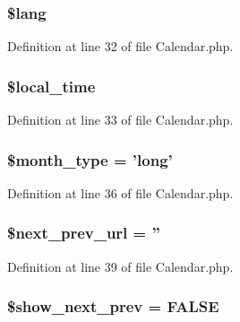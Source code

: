\subsubsection[{\$lang}]{\setlength{\rightskip}{0pt plus 5cm}\$lang}\label{class_c_i___calendar_a7714b111b644017933931ec69a154102}


Definition at line 32 of file Calendar.\-php.

\subsubsection[{\$local\-\_\-time}]{\setlength{\rightskip}{0pt plus 5cm}\$local\-\_\-time}\label{class_c_i___calendar_a0233c9bb13f81d81d6e34641b25898da}


Definition at line 33 of file Calendar.\-php.

\subsubsection[{\$month\-\_\-type}]{\setlength{\rightskip}{0pt plus 5cm}\$month\-\_\-type = 'long'}\label{class_c_i___calendar_ab40961ce0a0e4a7ee10ad389c9566b28}


Definition at line 36 of file Calendar.\-php.

\subsubsection[{\$next\-\_\-prev\-\_\-url}]{\setlength{\rightskip}{0pt plus 5cm}\$next\-\_\-prev\-\_\-url = ''}\label{class_c_i___calendar_a3ed0df912e3e67eb17d432c1f54ae2de}


Definition at line 39 of file Calendar.\-php.

\subsubsection[{\$show\-\_\-next\-\_\-prev}]{\setlength{\rightskip}{0pt plus 5cm}\$show\-\_\-next\-\_\-prev = F\-A\-L\-S\-E}\label{class_c_i___calendar_aeade2ffe515604c0dffb78d32ca846ae}


